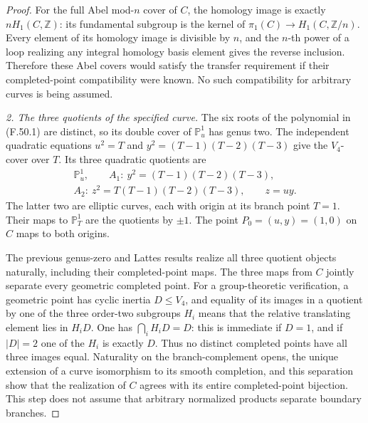 \documentclass[11pt]{article}
\begin{document}
\begin{proof}
For the full Abel mod-\(n\) cover of \(C\), the
homology image is exactly \(nH_1(C,\mathbb Z)\):
its fundamental subgroup is the kernel of
\(\pi_1(C)\to H_1(C,\mathbb Z/n)\).
Every element of its homology image is divisible by
\(n\), and the \(n\)-th power of a loop realizing
any integral homology basis element gives the reverse
inclusion. Therefore these Abel covers would satisfy
the transfer requirement if their completed-point
compatibility were known. No such compatibility for
arbitrary curves is being assumed.

\emph{2. The three quotients of the specified curve.}
The six roots of the polynomial in (F.50.1) are
distinct, so its double cover of \(\mathbb P^1_u\)
has genus two. The independent quadratic equations
\(u^2=T\) and \(y^2=(T-1)(T-2)(T-3)\) give
the \(V_4\)-cover over \(T\). Its three quadratic
quotients are
\[
 \begin{gathered}
 \mathbb P^1_u,\qquad A_1:\ y^2=(T-1)(T-2)(T-3),\\
 A_2:\ z^2=T(T-1)(T-2)(T-3),\qquad z=uy.
 \end{gathered}
                                                        \tag{F.50.6}
\]
The latter two are elliptic curves, each with origin
at its branch point \(T=1\). Their maps to
\(\mathbb P^1_T\) are the quotients by \(\pm1\).
The point \(P_0=(u,y)=(1,0)\) on \(C\) maps to
both origins.

The previous genus-zero and Lattes results realize
all three quotient objects naturally, including
their completed-point maps. The three maps from
\(C\) jointly separate every geometric completed
point. For a group-theoretic verification, a
geometric point has cyclic inertia \(D\leq V_4\),
and equality of its images in a quotient by one
of the three order-two subgroups \(H_i\) means
that the relative translating element lies in
\(H_iD\). One has
\(\bigcap_iH_iD=D\): this is immediate if
\(D=1\), and if \(|D|=2\) one of the \(H_i\)
is exactly \(D\). Thus no distinct completed
points have all three images equal. Naturality
on the branch-complement opens, the unique
extension of a curve isomorphism to its smooth
completion, and this separation show that the
realization of \(C\) agrees with its entire
completed-point bijection. This step does not
assume that arbitrary normalized products
separate boundary branches.


\end{proof}
\end{document}

